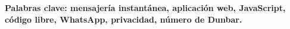 \begin{comment}

Instant messaging applications are a major component of interpersonal communications; even more so for people who do not see each other on a day-to-day basis. In October 2020, WhatsApp reported sending about 200 billion messages per day and, as of today, it has more than 2 billion users.

In 1992, Robin Dunbar approximated the number of people who can fully relate to each other in a system by 150, relating it to the size of the brain's neocortex and its processing capacity. Knowing the objective state of personal relationships with our circles can be of vital importance for the maintenance, preservation and improvement of strong, lasting and healthy relationships.

The main objective of this project is to provide the user with a tool that offers this objective data in a visual and easily understandable way, allowing its analysis and subsequent action accordingly.

The human being generates and collects more and more data in the digital era. With the growth of this trend, users are increasingly aware of the value of their data and the use that can be made of it in the wrong hands. Privacy is a major concern in the realm of personal conversations, and it has been considered a primary concern during the development of this application. To protect user data, the entire application is sent to the client, and all necessary operations are executed on the client's device. Additionally, the application is open-source, and the code is freely accessible for reading and modification by users and contributors under the \acrfull{gplv3} license.\cite{GPLv3} The application is built using React.

Overall, this project presents the design and implementation of a web application that allows users to analyze their WhatsApp chats and gain insights into their social interactions and relationships, all while ensuring data privacy and accessibility under an open-source license. It is called \textit{ChatStats}.

Debido a la importancia de la privacidad de los datos en el ámbito de las conversaciones personales, se ha tenido en cuenta durante el desarrollo del proyecto como principal preocupación para la arquitectura.

Por ello se ha desarrollado una aplicación web que se envía al cliente en su totalidad para que todas las operaciones necesarias se ejecuten en su dispositivo. Además, todo el código es de acceso libre para lectura y modificación de usuarios y contribuyentes, categorizando el proyecto como \textit{software} libre y gratuito bajo la licencia \acrfull{gplv3}. \cite{GPLv3}
 
\end{comment}


\vfill
\textbf{Palabras clave: mensajería instantánea, aplicación web, JavaScript, código libre, WhatsApp, privacidad, número de Dunbar.} 